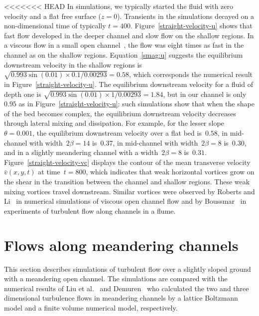 \documentclass[twocolumn]{afmc_art}
\newcommand{\vv}{{\bar v}}
\begin{document}
<<<<<<< HEAD
In simulations, we typically started the fluid with zero velocity and a flat free surface ($z=0$). 
Transients in the simulations decayed on a non-dimensional time of typically $t=400$.
Figure~\ref{straight-velocity-u} shows that fast flow developed in the deeper channel and slow flow on the shallow regions.
In a viscous flow in a small open channel~\cite{Robertsli2006}, the flow was eight times as fast in the channel as on the shallow regions. 
Equation~\eqref{smag:u} suggests the equilibrium downstream velocity in the shallow regions is $\sqrt{0.993\sin(0.01)\times0.1/0.00293}=0.58$, which corresponds the numerical result in Figure~\ref{straight-velocity-u}. 
The equilibrium downstream velocity for a fluid of depth one is $\sqrt{0.993\sin(0.01)\times1/0.00293}=1.84$, but in our channel is only~$0.95$ as in Figure~\ref{straight-velocity-u}: 
such simulations show that when the shape of the bed becomes complex, the equilibrium downstream velocity decreases through lateral mixing and dissipation. 
For example, for the lesser slope~$\theta=0.001$, the equilibrium downstream velocity over a flat bed is~$0.58$, in mid-channel with  width~$2\beta=14$ is~$0.37$, in mid-channel with  width~$2\beta=8$ is~$0.30$, and in a slightly meandering channel with a width~$2\beta=8$ is~$0.31$.
Figure~\ref{straight-velocity-vc} displays the contour of the mean transverse velocity~$\vv(x,y,t)$ at time~$t=800$, which indicates that weak horizontal vortices grow on the shear in the transition between the channel and shallow regions.  
These weak mixing vortices travel downstream. 
Similar vortices were observed by Roberts and Li~\cite{Robertsli2006} in numerical simulations of viscous open channel flow and by Boussmar~\cite{Bousmar2003a} in experiments of turbulent flow along channels in a flume. 








\section{Flows along meandering channels}

This section describes simulations of turbulent flow over a slightly sloped ground with a meandering open channel. 
The simulations are compared with the numerical results of Liu et al.~\cite{Liu2009} and Demuren~\cite{Demuren1993} who calculated the two and three dimensional turbulence flows in meandering channels by a lattice Boltzmann model and a finite volume numerical model, respectively.
\end{document}
